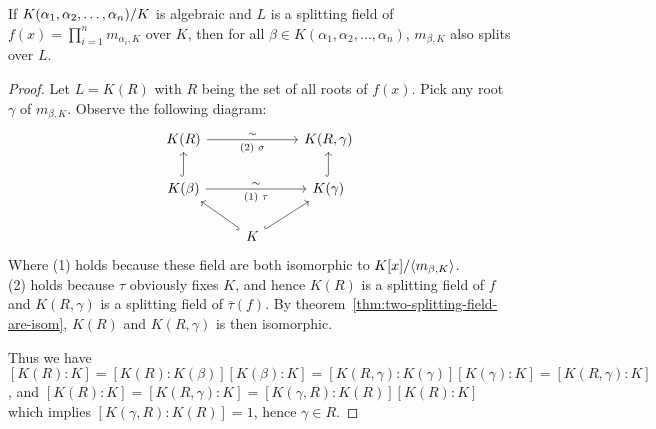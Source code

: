\begin{lemma} \label{lemma:element-in-alg-ext-splits}
  If ${K(\alpha_1, \alpha_2, \dots, \alpha_n)}/{K}$ is algebraic and $L$ is a splitting field of
  $f(x) = \prod_{i=1}^n m_{\alpha_i, K}$
  over $K$, then for all $\beta \in K(\alpha_1, \alpha_2, \dots, \alpha_n)$,
  $m_{\beta, K}$ also splits over $L$.

  \begin{proof}
    Let $L = K(R)$ with $R$ being the set of all roots of $f(x)$. Pick any root $\gamma$ of $m_{\beta, K}$.
    Observe the following diagram:
  \[
    \begin{tikzcd}
      K(R) \arrow[rr, "\sim", "\text{(2) } \sigma"'] & & K(R, \gamma) \\
      K(\beta) \arrow[u, hookrightarrow] \arrow[rr, "\sim", "\text{(1) } \tau"'] & & K(\gamma) \arrow[u, hookrightarrow] \\
      & K \arrow[ur, hookrightarrow] \arrow[ul, hookrightarrow] &
    \end{tikzcd}
  \]
  Where (1) holds because these field are both isomorphic to ${K[x]}/{\langle m_{\beta, K} \rangle}$. \\
  (2) holds because $\tau$ obviously fixes $K$, and hence $K(R)$ is a splitting field of $f$
  and $K(R, \gamma)$ is a splitting field of $\bar\tau(f)$. By theorem~\ref{thm:two-splitting-field-are-isom},
  $K(R)$ and $K(R, \gamma)$ is then isomorphic.

  Thus we have $[K(R): K] = [K(R): K(\beta)][K(\beta): K] = [K(R, \gamma): K(\gamma)][K(\gamma): K]
  = [K(R, \gamma): K]$, and $[K(R): K] = [K(R, \gamma): K] = [K(\gamma, R): K(R)][K(R): K]$
  which implies $[K(\gamma, R): K(R)] = 1$, hence $\gamma \in R$.

  \end{proof}
\end{lemma}


